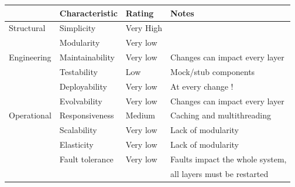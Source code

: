 \begin{table}[h!]
  \renewcommand{\arraystretch}{1.4}
  \centering
  \begin{tabular}{l l l l}
    \toprule
                & \textbf{Characteristic} & \textbf{Rating} & \textbf{Notes}                  \\
    \midrule
    Structural  & Simplicity              & Very High       &                                 \\
                & Modularity              & Very low        &                                 \\
    \midrule
    Engineering & Maintainability         & Very low        & Changes can impact every layer  \\
                & Testability             & Low             & Mock/stub components            \\
                & Deployability           & Very low        & At every change !               \\
                & Evolvability            & Very low        & Changes can impact every layer  \\
    \midrule
    Operational & Responsiveness          & Medium          & Caching and multithreading      \\
                & Scalability             & Very low        & Lack of modularity              \\
                & Elasticity              & Very low        & Lack of modularity              \\
                & Fault tolerance         & Very low        & Faults impact the whole system, \\
                &                         &                 & all layers must be restarted    \\
    \bottomrule
  \end{tabular}
\end{table}

